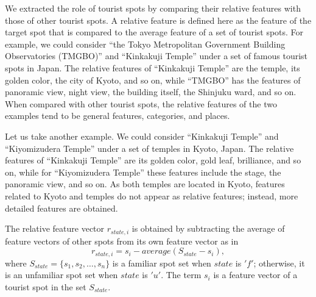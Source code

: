 \documentclass[journal]{IAENGtran}
\begin{document}
We extracted the role of tourist spots by comparing their relative features with those of other tourist spots.
A relative feature is defined here as the feature of the target spot that is compared to the average feature of a set of tourist spots.
For example, we could consider ``the Tokyo Metropolitan Government Building Observatories (TMGBO)'' and ``Kinkakuji Temple'' under a set of famous tourist spots in Japan.
The relative features of ``Kinkakuji Temple'' are the temple, its golden color, the city of Kyoto, and so on, while ``TMGBO'' has the features of panoramic view, night view, the building itself, the Shinjuku ward, and so on.
When compared with other tourist spots, the relative features of the two examples tend to be general features, categories, and places.

Let us take another example.
We could consider ``Kinkakuji Temple'' and ``Kiyomizudera Temple'' under a set of temples in Kyoto, Japan.
The relative features of ``Kinkakuji Temple'' are its golden color, gold leaf, brilliance, and so on, while for ``Kiyomizudera Temple'' these features include the stage, the panoramic view, and so on.
As both temples are located in Kyoto, features related to Kyoto and temples do not appear as relative features; instead, more detailed features are obtained.

The relative feature vector $r_{state,i}$ is obtained by subtracting the average of feature vectors of other spots from its own feature vector as in
\begin{equation}
  r_{state,i}=s_i-average(S_{state}-s_i),
  \label{math:Vector difference}
\end{equation}
where $S_{state} =\{s_1,s_2,\dots,s_n\}$ is a familiar spot set when $state$ is $'f'$; otherwise, it is an unfamiliar spot set when $state$ is $'u'$.
The term $s_i$ is a feature vector of a tourist spot in the set $S_{state}$.
\end{document}
